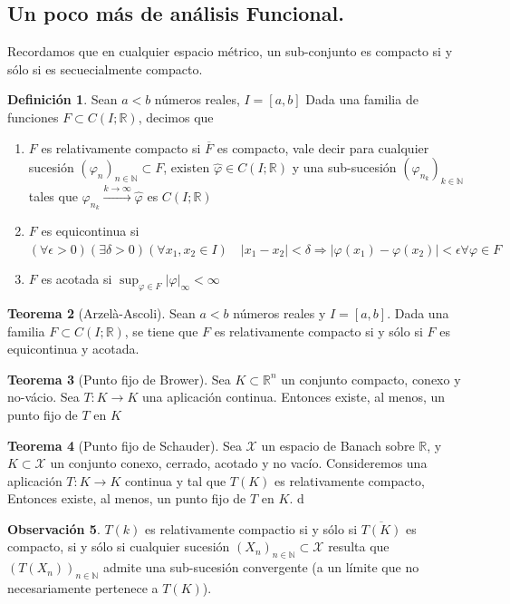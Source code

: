 \documentclass[11pt]{article}
\theoremstyle{definition} %
\newtheorem{theorem}{Teorema}[section]
\newtheorem{definition}[theorem]{Definición}
\newtheorem{remark}[theorem]{Observación}
\newcommand{\R}{\mathbb{R}}
\newcommand{\N}{\mathbb{N}}
\begin{document}
\subsection{Un poco más de análisis Funcional.}
Recordamos que en cualquier espacio métrico, un sub-conjunto es compacto si y sólo si es secuecialmente compacto.

\begin{definition}
  Sean $a<b$ números reales, $I=[a,b]$ Dada una familia de funciones $  F\subset C(I;\R)$, decimos que
  \begin{enumerate}
    \item $F$ es relativamente compacto si $\overline{F}$ es compacto, vale decir para cualquier sucesión $(\varphi_n)_{n\in \N} \subset F$, existen $\hat{\varphi} \in C(I;\R)$ y una sub-sucesión $(\varphi_{n_k})_{k\in \N}$ tales que $\varphi_{n_k} \xrightarrow{k\to \infty}\hat{\varphi}$ es $ C(I;\R)$
    \item $F$ es equicontinua si $(\forall \epsilon >0)(\exists \delta > 0)(\forall x_1,x_2 \in I) \quad |x_1-x_2|<\delta \Rightarrow |\varphi(x_1)-\varphi(x_2)|<\epsilon \forall \varphi \in F$ 
    \item $F$ es acotada si $\sup_{\varphi \in F}|\varphi|_{\infty} < \infty $ 
  \end{enumerate}
\end{definition}

\begin{theorem}[Arzelà-Ascoli] 
  Sean $a<b$ números reales y $I=[a,b]$. Dada una familia $F\subset C(I;\R)$, se tiene que $F$ es relativamente compacto si y sólo si $F$ es equicontinua y acotada.
\end{theorem}

\begin{theorem}[Punto fijo de Brower] 
  Sea $K\subset \R^n$ un conjunto compacto, conexo y no-vácio. Sea $T:K\rightarrow K$ una aplicación continua. Entonces existe, al menos, un punto fijo de $T$ en $K$
\end{theorem}

\begin{theorem}[Punto fijo de Schauder]
  Sea $\mathcal{X}$ un espacio de Banach sobre $\R$, y $K\subset \mathcal{X}$ un conjunto conexo, cerrado, acotado y no vacío. Consideremos una aplicación $T:K\rightarrow K$  continua y tal que $T(K)$ es relativamente compacto, Entonces existe, al menos, un punto fijo de $T$ en $K$.
d\end{theorem}

\begin{remark}
  $T(k)$ es relativamente compactio si y sólo si $\overline{T(K)}$ es compacto, si y sólo si cualquier sucesión $(X_n)_{n\in \N}\subset \mathcal{X}$ resulta que $(T(X_n))_{n\in \N}$ admite una sub-sucesión convergente (a un límite que no necesariamente pertenece a $T(K)$).
\end{remark}
\end{document}
